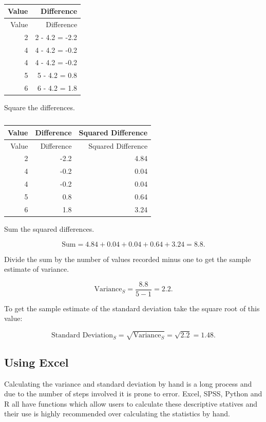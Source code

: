 \documentclass[
]{book}
\begin{document}
\begin{longtable}[]{@{}rr@{}}
\caption{\label{tab:table8}}\tabularnewline
\toprule
Value & Difference \\
\midrule
\endfirsthead
\toprule
Value & Difference \\
\midrule
\endhead
2 & 2 - 4.2 = -2.2 \\
4 & 4 - 4.2 = -0.2 \\
4 & 4 - 4.2 = -0.2 \\
5 & 5 - 4.2 = 0.8 \\
6 & 6 - 4.2 = 1.8 \\
\bottomrule
\end{longtable}

Square the differences.

\begin{longtable}[]{@{}rrr@{}}
\caption{\label{tab:table9}}\tabularnewline
\toprule
Value & Difference & Squared Difference \\
\midrule
\endfirsthead
\toprule
Value & Difference & Squared Difference \\
\midrule
\endhead
2 & -2.2 & 4.84 \\
4 & -0.2 & 0.04 \\
4 & -0.2 & 0.04 \\
5 & 0.8 & 0.64 \\
6 & 1.8 & 3.24 \\
\bottomrule
\end{longtable}

Sum the squared differences.

\[\textrm{Sum} = 4.84 + 0.04 + 0.04 + 0.64 + 3.24 = 8.8. \]

Divide the sum by the number of values recorded minus one to get the sample estimate of variance.

\[ \textrm{Variance}_{S} = \frac{8.8}{5-1} = 2.2.\]

To get the sample estimate of the standard deviation take the square root of this value:

\[ \textrm{Standard Deviation}_S = \sqrt{ \textrm{Variance}_{S}} = \sqrt{2.2} = 1.48.\]

\hypertarget{using-excel-1}{%
\subsection{Using Excel}\label{using-excel-1}}

Calculating the variance and standard deviation by hand is a long process and due to the number of steps involved it is prone to error. Excel, SPSS, Python and R all have functions which allow users to calculate these descriptive statives and their use is highly recommended over calculating the statistics by hand.
\end{document}

